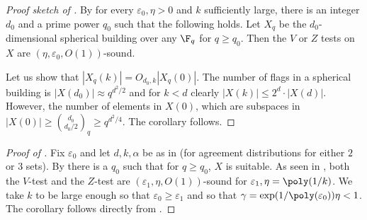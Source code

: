 \begin{proof}[Proof sketch of ]
    By  for every \(\varepsilon_0,\eta > 0\) and \(k\) sufficiently large, there is an integer \(d_0\) and a prime power \(q_0\) such that the following holds. Let \(X_q\) be the \(d_0\)-dimensional spherical building over any \(\F_q\) for \(q\geq q_0\). Then the \(V\) or \(Z\) tests on \(X\) are \((\eta,\varepsilon_0,O(1))\)-sound. 
    
    Let us show that \(|X_q(k)| = O_{d_0,k}|X_q(0)|\). The number of flags in a spherical building is $|X(d_0)|\approx q^{d^2/2}$ and for $k<d$ clearly $|X(k)|\leq 2^d\cdot|X(d)|$. However, the number of elements in \(X(0)\), which are subspaces in $|X(0)| \geq \binom{d_0}{d_0/2}_q \geq q^{d^2/4}$. The corollary follows.
\end{proof}

\begin{proof}[Proof of ]
Fix \(\varepsilon_0\) and let \(d,k,\alpha\) be as in  (for agreement distributions for either \(2\) or \(3\) sets). By  there is a \(q_0\) such that for \(q \geq q_0\), \(X\) is suitable. As seen in , both the \(V\)-test and the \(Z\)-test are \((\varepsilon_1,\eta,O(1))\)-sound for \(\varepsilon_1, \eta = \poly(1/k)\). We take \(k\) to be large enough so that \(\varepsilon_0 \geq \varepsilon_1\) and so that \(\gamma = \exp(1/\poly(\varepsilon_0))\eta < 1\). The corollary follows directly from .
\end{proof}
